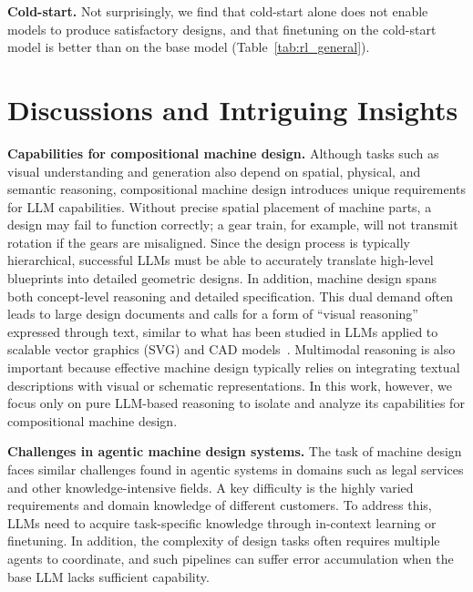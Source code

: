 \documentclass{article} %
\theoremstyle{plain}
\theoremstyle{definition}
\begin{document}
\textbf{Cold-start.}
Not surprisingly, we find that cold-start alone does not enable models to produce satisfactory designs, and that finetuning on the cold-start model is better than on the base model (Table~\ref{tab:rl_general}).



\vspace{-1.5mm}
\section{Discussions and Intriguing Insights}
\vspace{-1.5mm}

\textbf{Capabilities for compositional machine design.} Although tasks such as visual understanding and generation also depend on spatial, physical, and semantic reasoning, compositional machine design introduces unique requirements for LLM capabilities. Without precise spatial placement of machine parts, a design may fail to function correctly; a gear train, for example, will not transmit rotation if the gears are misaligned. Since the design process is typically hierarchical, successful LLMs must be able to accurately translate high-level blueprints into detailed geometric designs. In addition, machine design spans both concept-level reasoning and detailed specification. This dual demand often leads to large design documents and calls for a form of “visual reasoning” expressed through text, similar to what has been studied in LLMs applied to scalable vector graphics (SVG) and CAD models~\citep{qiu2025sgpbench,alrashedy2025generating}. Multimodal reasoning is also important because effective machine design typically relies on integrating textual descriptions with visual or schematic representations. In this work, however, we focus only on pure LLM-based reasoning to isolate and analyze its capabilities for compositional machine design.




\textbf{Challenges in agentic machine design systems.} The task of machine design faces similar challenges found in agentic systems in domains such as legal services and other knowledge-intensive fields. A key difficulty is the highly varied requirements and domain knowledge of different customers. To address this, LLMs need to acquire task-specific knowledge through in-context learning or finetuning. In addition, the complexity of design tasks often requires multiple agents to coordinate, and such pipelines can suffer error accumulation when the base LLM lacks sufficient capability.
\end{document}
